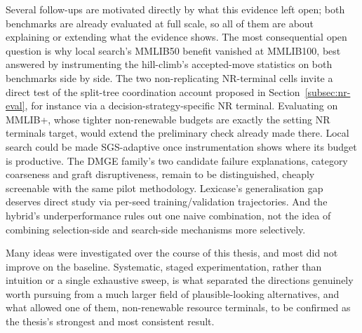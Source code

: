 \label{sec:future-work}
Several follow-ups are motivated directly by what this evidence left open;
both benchmarks are already evaluated at full scale, so all of them are
about explaining or extending what the evidence shows. The most
consequential open question is why local search's MMLIB50 benefit
vanished at MMLIB100, best answered by instrumenting the hill-climb's
accepted-move statistics on both benchmarks side by side. The two
non-replicating NR-terminal cells invite a direct test of the split-tree
coordination account proposed in Section~\ref{subsec:nr-eval}, for
instance via a decision-strategy-specific NR terminal. Evaluating on
MMLIB+, whose tighter non-renewable budgets are exactly the setting NR
terminals target, would extend the preliminary check already made there.
Local search could be made SGS-adaptive once instrumentation shows where
its budget is productive. The DMGE family's two candidate failure
explanations, category coarseness and graft disruptiveness, remain to be
distinguished, cheaply screenable with the same pilot methodology.
Lexicase's generalisation gap deserves direct study via per-seed
training/validation trajectories. And the hybrid's underperformance rules out
one naive combination, not the idea of combining selection-side and
search-side mechanisms more selectively.

Many ideas were investigated over the course of this thesis, and most did
not improve on the baseline. Systematic, staged experimentation, rather
than intuition or a single exhaustive sweep, is what separated the
directions genuinely worth pursuing from a much larger field of
plausible-looking alternatives, and what allowed one of them, non-renewable
resource terminals, to be confirmed as the thesis's strongest and most
consistent result. 
